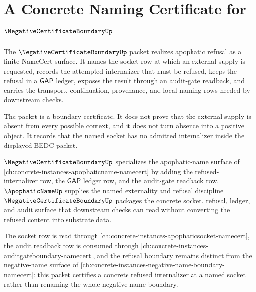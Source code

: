 \chapter{A Concrete Naming Certificate for $\NegativeCertificateBoundaryUp$}
\label{ch:concrete-instances-negativecertificateboundary-namecert}

The $\NegativeCertificateBoundaryUp$ packet realizes apophatic refusal as a finite NameCert surface. It names the socket row at which an external supply is requested, records the attempted internalizer that must be refused, keeps the refusal in a $\mathsf{GAP}$ ledger, exposes the result through an audit-gate readback, and carries the transport, continuation, provenance, and local naming rows needed by downstream checks.

The packet is a boundary certificate. It does not prove that the external supply is absent from every possible context, and it does not turn absence into a positive object. It records that the named socket has no admitted internalizer inside the displayed BEDC packet.

$\NegativeCertificateBoundaryUp$ specializes the apophatic-name surface of \autoref{ch:concrete-instances-apophaticname-namecert} by adding the refused-internalizer row, the $\mathsf{GAP}$ ledger row, and the audit-gate readback row. $\ApophaticNameUp$ supplies the named externality and refusal discipline; $\NegativeCertificateBoundaryUp$ packages the concrete socket, refusal, ledger, and audit surface that downstream checks can read without converting the refused content into substrate data.

The socket row is read through \autoref{ch:concrete-instances-apophaticsocket-namecert}, the audit readback row is consumed through \autoref{ch:concrete-instances-auditgateboundary-namecert}, and the refusal boundary remains distinct from the negative-name surface of \autoref{ch:concrete-instances-negative-name-boundary-namecert}: this packet certifies a concrete refused internalizer at a named socket rather than renaming the whole negative-name boundary.

